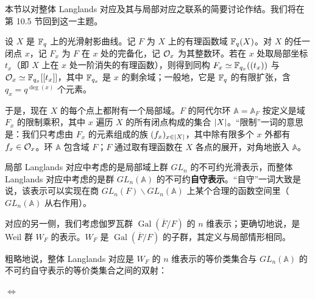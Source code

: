 本节以对整体 Langlands 对应及其与局部对应之联系的简要讨论作结。我们将在第 10.5 节回到这一主题。

设 $X$ 是 $\mathbb{F}_q$ 上的光滑射影曲线。记 $F$ 为 $X$ 上的有理函数域 $\mathbb{F}_q(X)$。对 $X$ 的任一闭点 $x$，记 $F_x$ 为 $F$ 在 $x$ 处的完备化，记 $\mathcal{O}_x$ 为其整数环。若在 $x$ 处取局部坐标 $t_x$（即 $X$ 上在 $x$ 处一阶消失的有理函数），则得到同构 $F_x\simeq\mathbb{F}_{q_x}((t_x))$ 与 $\mathcal{O}_x\simeq\mathbb{F}_{q_x}[[t_x]]$，其中 $\mathbb{F}_{q_x}$ 是 $x$ 的剩余域；一般地，它是 $\mathbb{F}_q$ 的有限扩张，含 $q_x=q^{\deg(x)}$ 个元素。


于是，现在 $X$ 的每个点上都附有一个局部域。$F$ 的阿代尔环 $\mathbb{A}=\mathbb{A}_F$ 按定义是域 $F_x$ 的限制乘积，其中 $x$ 遍历 $X$ 的所有闭点构成的集合 $\lvert X\rvert$。“限制”一词的意思是：我们只考虑由 $F_x$ 的元素组成的族 $(f_x)_{x\in\lvert X\rvert}$，其中除有限多个 $x$ 外都有 $f_x\in\mathcal{O}_x$。环 $\mathbb{A}$ 包含域 $F$；$F$ 通过取有理函数在 $X$ 各点的展开，对角地嵌入 $\mathbb{A}$。


局部 Langlands 对应中考虑的是局部域上群 $GL_n$ 的不可约光滑表示，而整体 Langlands 对应中考虑的是群 $GL_n(\mathbb{A})$ 的不可约\textbf{自守表示}。“自守”一词大致是说，该表示可以实现在商 $GL_n(F)\backslash GL_n(\mathbb{A})$ 上某个合理的函数空间里（$GL_n(\mathbb{A})$ 从右作用）。

对应的另一侧，我们考虑伽罗瓦群 $\operatorname{Gal}(\overline{F}/F)$ 的 $n$ 维表示；更确切地说，是 Weil 群 $W_F$ 的表示。$W_F$ 是 $\operatorname{Gal}(\overline{F}/F)$ 的子群，其定义与局部情形相同。

粗略地说，整体 Langlands 对应是 $W_F$ 的 $n$ 维表示的等价类集合与 $GL_n(\mathbb{A})$ 的不可约自守表示的等价类集合之间的双射：
\begin{center}
\quad$\Longleftrightarrow$\quad
{}
\end{center}

